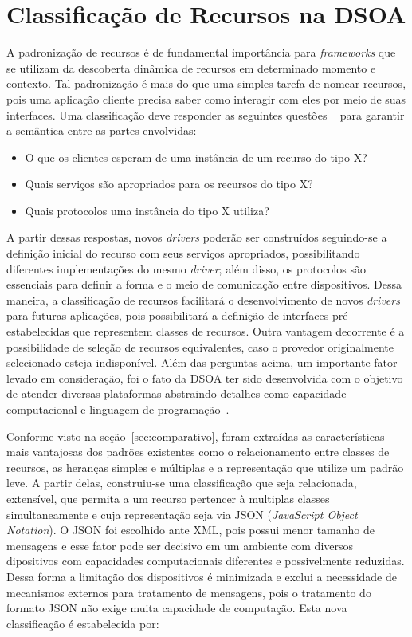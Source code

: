 \chapter{Classificação de Recursos na DSOA}

A padronização de recursos é de fundamental importância para \emph{frameworks} que se utilizam da descoberta dinâmica de recursos em determinado momento e contexto. Tal padronização é mais do que uma simples tarefa de nomear recursos, pois uma aplicação cliente precisa saber como interagir com eles por meio de suas interfaces. Uma classificação deve responder as seguintes questões ~\cite{pervasiveComputing} para garantir a semântica entre as partes envolvidas:

\begin{itemize}
	\item O que os clientes esperam de uma instância de um recurso do tipo X?

	\item Quais serviços são apropriados para os recursos do tipo X?

	\item Quais protocolos uma instância do tipo X utiliza?
\end{itemize}

A partir dessas respostas, novos \emph{drivers} poderão ser construídos seguindo-se a definição inicial do recurso com seus serviços apropriados, possibilitando diferentes implementações do mesmo \emph{driver}; além disso, os protocolos são essenciais para definir a forma e o meio de comunicação entre dispositivos. Dessa maneira, a classificação de recursos facilitará o desenvolvimento de novos \emph{drivers} para futuras aplicações, pois possibilitará a definição de interfaces pré-estabelecidas que representem classes de recursos. Outra vantagem decorrente é a possibilidade de seleção de recursos equivalentes, caso o provedor originalmente selecionado esteja indisponível. Além das perguntas acima, um importante fator levado em consideração, foi o fato da DSOA ter sido desenvolvida com o objetivo de atender diversas plataformas abstraindo detalhes como capacidade computacional e linguagem de programação~\cite{buzetoDSOA2010}.

Conforme visto na seção~\ref{sec:comparativo}, foram extraídas as características mais vantajosas dos padrões existentes como o relacionamento entre classes de recursos, as heranças simples e múltiplas e a representação que utilize um padrão leve. A partir delas, construiu-se uma classificação que seja relacionada, extensível, que permita a um recurso pertencer à multiplas classes simultaneamente e cuja representação seja via JSON (\emph{JavaScript Object Notation}). O JSON foi escolhido ante XML, pois possui menor tamanho de mensagens e esse fator pode ser decisivo em um ambiente com diversos dipositivos com capacidades computacionais diferentes e possivelmente reduzidas. Dessa forma a limitação dos dispositivos é minimizada e exclui a necessidade de mecanismos externos para tratamento de mensagens, pois o tratamento do formato JSON não exige muita capacidade de computação. Esta nova classificação é estabelecida por:

